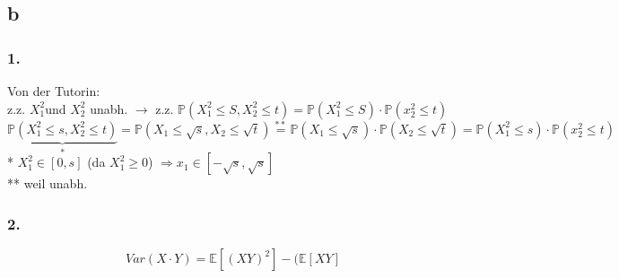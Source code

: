 \documentclass{article} %
\newcommand{\p}[0]{\mathbb{P}}
\newcommand{\E}[1]{\mathbb{E}[#1]}
\begin{document}
 \subsection*{b}
 \subsubsection*{1.}
 Von der Tutorin:  \\
 z.z. \(X_1^2\)und $X_2^2$ unabh. $\rightarrow$ z.z. \(\p(X_1^2 \leq S, X_2^2 \leq t) = \p(X_1^2 \leq S) \cdot \p(x_2^2 \leq t)\)
 \[
\underbrace{\p(X_1^2 \leq s, X_2^2 \leq t)}_* = \p(X_1 \leq \sqrt{s}, X_2 \leq \sqrt{t}) \overset{**}{=} \p(X_1 \leq \sqrt{s}) \cdot \p(X_2 \leq \sqrt{t}) = \p(X_1^2 \leq s) \cdot \p(x_2^2 \leq t)
 \]
 * $X_1^2 \in [0,s]$ (da $X_1^2 \geq 0$) $\Rightarrow x_1 \in [-\sqrt{s}, \sqrt{s}]$   \\
 ** weil unabh. 
 
 
 \subsubsection*{2.}
 \[
 Var(X \cdot Y ) = \E{(XY)^2} - (\E{XY}
 \]
 
\end{document}
